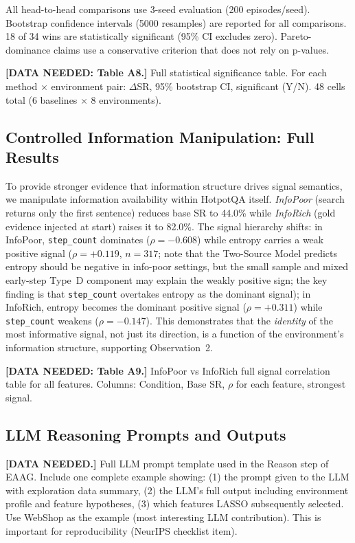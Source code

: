 All head-to-head comparisons use 3-seed evaluation (200 episodes/seed).
Bootstrap confidence intervals (5000 resamples) are reported for all
comparisons. 18 of 34 wins are statistically significant (95\% CI
excludes zero). Pareto-dominance claims use a conservative criterion
that does not rely on p-values.

{\color{blue} \textbf{[DATA NEEDED: Table A8.]} Full statistical significance table.
For each method $\times$ environment pair: $\Delta$SR, 95\% bootstrap CI,
significant (Y/N). 48 cells total (6 baselines $\times$ 8 environments).}

\subsection{Controlled Information Manipulation: Full Results}
\label{app:controlled}

To provide stronger evidence that information structure drives signal
semantics, we manipulate information availability within HotpotQA
itself. \emph{InfoPoor} (search returns only the first sentence)
reduces base SR to 44.0\% while \emph{InfoRich} (gold evidence
injected at start) raises it to 82.0\%. The signal hierarchy shifts:
in InfoPoor, \texttt{step\_count} dominates ($\rho{=}{-}0.608$) while
entropy carries a weak positive signal ($\rho{=}{+}0.119$,
$n{=}317$; note that the Two-Source Model predicts entropy should be
negative in info-poor settings, but the small sample and mixed
early-step Type~D component may explain the weakly positive sign;
the key finding is that \texttt{step\_count} overtakes entropy as the
dominant signal); in InfoRich, entropy becomes the dominant positive
signal ($\rho{=}{+}0.311$) while \texttt{step\_count} weakens
($\rho{=}{-}0.147$). This demonstrates that the \emph{identity} of
the most informative signal, not just its direction, is a function
of the environment's information structure, supporting Observation~2.

{\color{blue} \textbf{[DATA NEEDED: Table A9.]} InfoPoor vs InfoRich
full signal correlation table for all features. Columns: Condition,
Base SR, $\rho$ for each feature, strongest signal.}

\subsection{LLM Reasoning Prompts and Outputs}
\label{app:llm-prompts}

{\color{blue} \textbf{[DATA NEEDED.]} Full LLM prompt template used in
the Reason step of EAAG. Include one complete example showing:
(1) the prompt given to the LLM with exploration data summary,
(2) the LLM's full output including environment profile and
feature hypotheses, (3) which features LASSO subsequently selected.
Use WebShop as the example (most interesting LLM contribution).
This is important for reproducibility (NeurIPS checklist item).}



